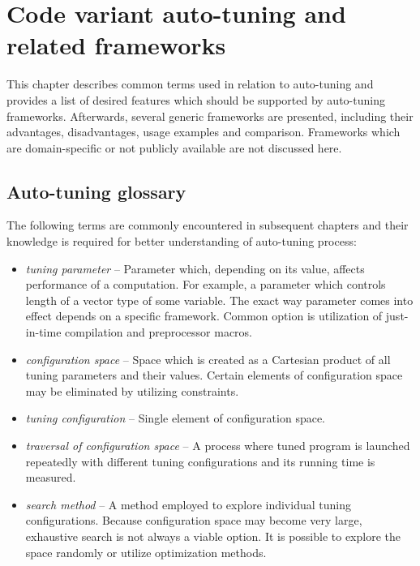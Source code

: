 \documentclass
[
    digital, %
    oneside, %
    table, %
    nolof, %
    nolot, %
    nocover %
]{fithesis3}
\begin{document}
\chapter{Code variant auto-tuning and related frameworks}
This chapter describes common terms used in relation to auto-tuning and provides a list of desired features which should be supported by auto-tuning
frameworks. Afterwards, several generic frameworks are presented, including their advantages, disadvantages, usage examples and comparison. Frameworks
which are domain-specific or not publicly available are not discussed here.

\section{Auto-tuning glossary}
The following terms are commonly encountered in subsequent chapters and their knowledge is required for better understanding of auto-tuning process:
\begin{itemize}
    \item \textit{tuning parameter} -- Parameter which, depending on its value, affects performance of a computation. For example, a parameter which
    controls length of a vector type of some variable. The exact way parameter comes into effect depends on a specific framework. Common option is
    utilization of just-in-time compilation and preprocessor macros.
    \item \textit{configuration space} -- Space which is created as a Cartesian product of all tuning parameters and their values. Certain elements of
    configuration space may be eliminated by utilizing constraints.
    \item \textit{tuning configuration} -- Single element of configuration space.
    \item \textit{traversal of configuration space} -- A process where tuned program is launched repeatedly with different tuning configurations and
    its running time is measured.
    \item \textit{search method} -- A method employed to explore individual tuning configurations. Because configuration space may become very large,
    exhaustive search is not always a viable option. It is possible to explore the space randomly or utilize optimization methods.
\end{itemize}
\end{document}
